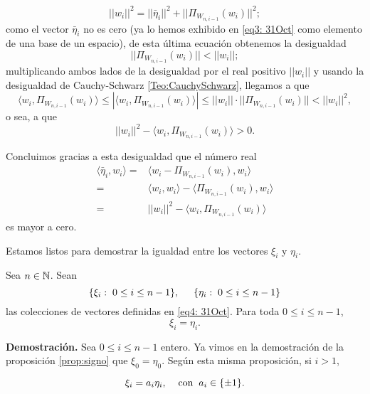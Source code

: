 \begin{itemize}
\[
||w_{i}||^{2} = ||\bar{\eta}_{i}||^{2} + ||\Pi_{W_{n,i-1}}(w_{i})||^{2};
\]
como el vector $\bar{\eta}_{i}$ no es cero (ya lo hemos
exhibido en \eqref{eq3: 31Oct} como elemento de una base de un espacio), de esta
última ecuación obtenemos la desigualdad
\[
||\Pi_{W_{n,i-1}}(w_{i})|| < ||w_{i}||;
\]
multiplicando ambos lados de la desigualdad
por el real positivo $||w_{i}||$ y usando
la desigualdad de Cauchy-Schwarz \ref{Teo:CauchySchwarz},
llegamos a que
\[
\langle w_{i} , \Pi_{W_{n,i-1}}(w_{i}) \rangle \leq 
|\langle w_{i} , \Pi_{W_{n,i-1}}(w_{i}) \rangle|
\leq ||w_{i}|| \cdot 
||\Pi_{W_{n,i-1}}(w_{i})|| < ||w_{i}||^{2},
\]
o sea, a que
\[
||w_{i}||^{2}-\langle w_{i} , \Pi_{W_{n,i-1}}(w_{i}) \rangle >0.
\]

Concluimos gracias a esta desigualdad que
el número real
\begin{align*}
\langle \bar{\eta}_{i} , w_{i} \rangle = &
\langle w_{i}- \Pi_{W_{n,i-1}}(w_{i}), w_{i} \rangle
\\ 
= & \langle w_{i}, w_{i}\rangle - 
\langle 
\Pi_{W_{n,i-1}}(w_{i}),w_{i} \rangle \\
= & ||w_{i}||^{2} - 
\langle w_{i}, \Pi_{W_{n,i-1}}(w_{i}) \rangle
\end{align*}
es mayor a cero.
\QEDB
\vspace{0.2cm}

Estamos listos para demostrar la igualdad 
entre los vectores $\xi_{i}$ y $\eta_{i}$.

\begin{prop} \label{igualdad entre los vectores xi sub i y eta sub i}
Sea $n \in \mathbb{N}$. Sean 
\begin{equation*}
\{\xi_{i}: \hspace{0.1cm} 0 \leq i \leq n-1 \}, \hspace{0.5cm}
\{\eta_{i}: \hspace{0.1cm} 0 \leq i \leq n-1 \}
\end{equation*}
las colecciones de vectores
definidas en
\eqref{eq4: 31Oct}. Para toda $0 \leq i \leq n-1$,
\[
\xi_{i} = \eta_{i}.
\]
\end{prop}
\noindent
\textbf{Demostración.}
Sea $0 \leq i \leq n-1$ entero. 
Ya vimos en la demostración
de la proposición 
\ref{prop:signo} que $\xi_{0}= \eta_{0}$. 
Según esta misma proposición,
si $i>1$,

\begin{equation}
\label{eq10: 1Nov}
\xi_{i}=a_{i} \eta_{i}, \hspace{0.4cm}
\text{con} \hspace{0.2cm} a_{i} \in \{ \pm 1 \}.
\end{equation}


\end{itemize}

